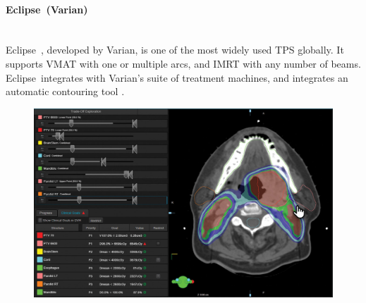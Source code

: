 \begin{multicols}{2}
	\paragraph{Eclipse\texttrademark\ (Varian)}
	\ \\
	Eclipse\texttrademark\ \cite{eclipse}, developed by Varian, is one of the most widely used TPS globally.
	It supports VMAT with one or multiple arcs, and IMRT with any number of beams.
	Eclipse\texttrademark\ integrates with Varian's suite of treatment machines, and integrates an automatic contouring tool \cite{eclipse_brochure}.
	
	\columnbreak
	
	\begin{figure}[H]
		\centering
		\includegraphics[width=\linewidth]{EclipseVarian.png}
		\label{peudofig:screenshot_eclipse}
	\end{figure}
\end{multicols}

